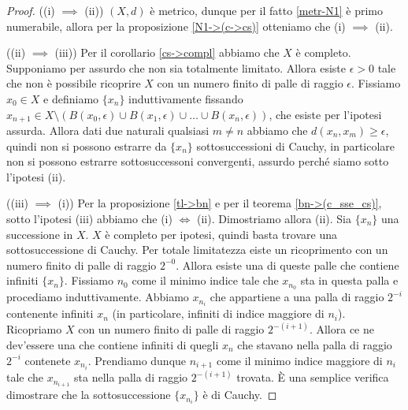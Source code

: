 \begin{proof}
  ((i) $\implies$ (ii)) $(X, d)$ è metrico, dunque per il fatto \ref{metr-N1} è primo numerabile, allora per la proposizione \ref{N1->(c->cs)} otteniamo che (i) $\implies$ (ii).

  ((ii) $\implies$ (iii)) Per il corollario \ref{cs->compl} abbiamo che $X$ è completo. Supponiamo per assurdo che non sia totalmente limitato. Allora esiste $\epsilon>0$ tale che non è possibile ricoprire $X$ con un numero finito di palle di raggio $\epsilon$. Fissiamo $x_0 \in X$ e definiamo $\{x_n\}$ induttivamente fissando $x_{n+1} \in X \setminus (B(x_0, \epsilon) \cup B(x_1, \epsilon) \cup \dots \cup B(x_n, \epsilon))$, che esiste per l'ipotesi assurda.
  Allora dati due naturali qualsiasi $m \not= n$ abbiamo che $d(x_n, x_m) \ge \epsilon$, quindi non si possono estrarre da $\{x_n\}$ sottosuccessioni di Cauchy, in particolare non si possono estrarre sottosuccessoni convergenti, assurdo perché siamo sotto l'ipotesi (ii).

  ((iii) $\implies$ (i)) Per la proposizione \ref{tl->bn} e per il teorema \ref{bn->(c_sse_cs)}, sotto l'ipotesi (iii) abbiamo che (i) $\Leftrightarrow$ (ii). Dimostriamo allora (ii). Sia $\{x_n\}$ una successione in $X$. $X$ è completo per ipotesi, quindi basta trovare una sottosuccessione di Cauchy.
  Per totale limitatezza eiste un ricoprimento con un numero finito di palle di raggio $2^{-0}$. Allora esiste una di queste palle che contiene infiniti $\{x_n\}$. Fissiamo $n_0$ come il minimo indice tale che $x_{n_0}$ sta in questa palla e procediamo induttivamente.
  Abbiamo $x_{n_i}$ che appartiene a una palla di raggio $2^{-i}$ contenente infiniti $x_n$ (in particolare, infiniti di indice maggiore di $n_i$). Ricopriamo $X$ con un numero finito di palle di raggio $2^{-(i+1)}$. Allora ce ne dev'essere una che contiene infiniti di quegli $x_n$ che stavano nella palla di raggio $2^{-i}$ contenete $x_{n_i}$. Prendiamo dunque $n_{i+1}$ come il minimo indice maggiore di $n_i$ tale che $x_{n_{i+1}}$ sta nella palla di raggio $2^{-(i+1)}$ trovata. È una semplice verifica dimostrare che la sottosuccessione $\{x_{n_i}\}$ è di Cauchy.
\end{proof}
